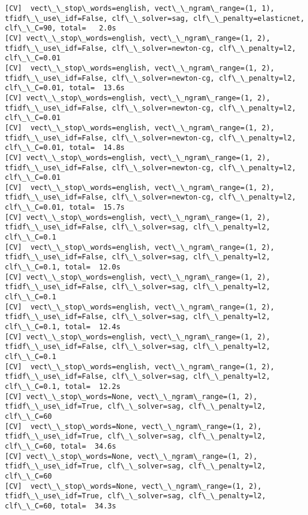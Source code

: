 \documentclass[11pt]{article}
\begin{document}
    \begin{Verbatim}[commandchars=\\\{\}]
[CV]  vect\_\_stop\_words=english, vect\_\_ngram\_range=(1, 1), tfidf\_\_use\_idf=False, clf\_\_solver=sag, clf\_\_penalty=elasticnet, clf\_\_C=90, total=   2.0s
[CV] vect\_\_stop\_words=english, vect\_\_ngram\_range=(1, 2), tfidf\_\_use\_idf=False, clf\_\_solver=newton-cg, clf\_\_penalty=l2, clf\_\_C=0.01 
[CV]  vect\_\_stop\_words=english, vect\_\_ngram\_range=(1, 2), tfidf\_\_use\_idf=False, clf\_\_solver=newton-cg, clf\_\_penalty=l2, clf\_\_C=0.01, total=  13.6s
[CV] vect\_\_stop\_words=english, vect\_\_ngram\_range=(1, 2), tfidf\_\_use\_idf=False, clf\_\_solver=newton-cg, clf\_\_penalty=l2, clf\_\_C=0.01 
[CV]  vect\_\_stop\_words=english, vect\_\_ngram\_range=(1, 2), tfidf\_\_use\_idf=False, clf\_\_solver=newton-cg, clf\_\_penalty=l2, clf\_\_C=0.01, total=  14.8s
[CV] vect\_\_stop\_words=english, vect\_\_ngram\_range=(1, 2), tfidf\_\_use\_idf=False, clf\_\_solver=newton-cg, clf\_\_penalty=l2, clf\_\_C=0.01 
[CV]  vect\_\_stop\_words=english, vect\_\_ngram\_range=(1, 2), tfidf\_\_use\_idf=False, clf\_\_solver=newton-cg, clf\_\_penalty=l2, clf\_\_C=0.01, total=  15.7s
[CV] vect\_\_stop\_words=english, vect\_\_ngram\_range=(1, 2), tfidf\_\_use\_idf=False, clf\_\_solver=sag, clf\_\_penalty=l2, clf\_\_C=0.1 
[CV]  vect\_\_stop\_words=english, vect\_\_ngram\_range=(1, 2), tfidf\_\_use\_idf=False, clf\_\_solver=sag, clf\_\_penalty=l2, clf\_\_C=0.1, total=  12.0s
[CV] vect\_\_stop\_words=english, vect\_\_ngram\_range=(1, 2), tfidf\_\_use\_idf=False, clf\_\_solver=sag, clf\_\_penalty=l2, clf\_\_C=0.1 
[CV]  vect\_\_stop\_words=english, vect\_\_ngram\_range=(1, 2), tfidf\_\_use\_idf=False, clf\_\_solver=sag, clf\_\_penalty=l2, clf\_\_C=0.1, total=  12.4s
[CV] vect\_\_stop\_words=english, vect\_\_ngram\_range=(1, 2), tfidf\_\_use\_idf=False, clf\_\_solver=sag, clf\_\_penalty=l2, clf\_\_C=0.1 
[CV]  vect\_\_stop\_words=english, vect\_\_ngram\_range=(1, 2), tfidf\_\_use\_idf=False, clf\_\_solver=sag, clf\_\_penalty=l2, clf\_\_C=0.1, total=  12.2s
[CV] vect\_\_stop\_words=None, vect\_\_ngram\_range=(1, 2), tfidf\_\_use\_idf=True, clf\_\_solver=sag, clf\_\_penalty=l2, clf\_\_C=60 
[CV]  vect\_\_stop\_words=None, vect\_\_ngram\_range=(1, 2), tfidf\_\_use\_idf=True, clf\_\_solver=sag, clf\_\_penalty=l2, clf\_\_C=60, total=  34.6s
[CV] vect\_\_stop\_words=None, vect\_\_ngram\_range=(1, 2), tfidf\_\_use\_idf=True, clf\_\_solver=sag, clf\_\_penalty=l2, clf\_\_C=60 
[CV]  vect\_\_stop\_words=None, vect\_\_ngram\_range=(1, 2), tfidf\_\_use\_idf=True, clf\_\_solver=sag, clf\_\_penalty=l2, clf\_\_C=60, total=  34.3s

\end{Verbatim}
\end{document}
